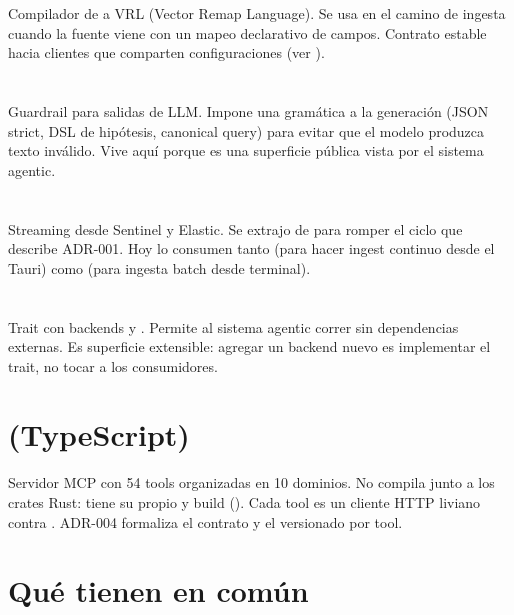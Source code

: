 Compilador de  a VRL (Vector Remap Language). Se
usa en el camino de ingesta cuando la fuente viene con un mapeo
declarativo de campos. Contrato estable hacia clientes que comparten
configuraciones (ver ).

\section{}

Guardrail para salidas de LLM. Impone una gramática a la generación
(JSON strict, DSL de hipótesis, canonical query) para evitar que el
modelo produzca texto inválido. Vive aquí porque es una superficie
pública vista por el sistema agentic.

\section{}

Streaming desde Sentinel y Elastic. Se extrajo de 
para romper el ciclo que describe ADR-001. Hoy lo consumen tanto
 (para hacer ingest continuo desde el Tauri)
como  (para ingesta batch desde terminal).

\section{}

Trait  con backends  y .
Permite al sistema agentic correr sin dependencias externas. Es
superficie extensible: agregar un backend nuevo es implementar el
trait, no tocar a los consumidores.

\section{ (TypeScript)}

Servidor MCP con 54 tools organizadas en 10 dominios. No compila
junto a los crates Rust: tiene su propio  y
build (). Cada tool es un cliente HTTP liviano
contra . ADR-004 formaliza el contrato
 y el versionado por tool.

\section{Qué tienen en común}

